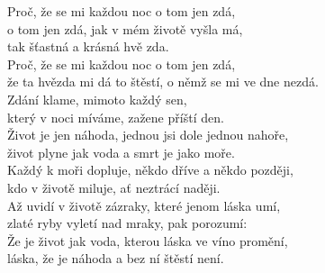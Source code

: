 
\nv{}Proč, že se mi každou noc o tom jen zdá,\\
o tom jen zdá, jak v mém životě vyšla má,\\
tak šťastná a krásná hvě zda.\\
Proč, že se mi každou noc o tom jen zdá,\\
že ta hvězda mi dá to štěstí, o němž se mi ve dne nezdá.
\vnv\\
Zdání klame, mimoto každý sen,\\
který v noci \mm mí\mm váme, zažene příští den. 
\vnv\\
Život je jen náhoda, jednou jsi dole jednou nahoře,\\
život plyne jak voda a smrt je jako moře. \\
Každý k moři dopluje, někdo dříve a někdo později,\\
kdo v životě miluje, ať neztrácí naději.\sm{}
\vnv\\
Až uvidí v životě zázraky, které jenom láska umí,\\
zlaté ryby vyletí nad mraky, pak porozumí:
\vnv\\
Že je život jak voda, kterou láska ve víno promění,\\
láska, že je náhoda a bez ní štěstí není.
\newpage
